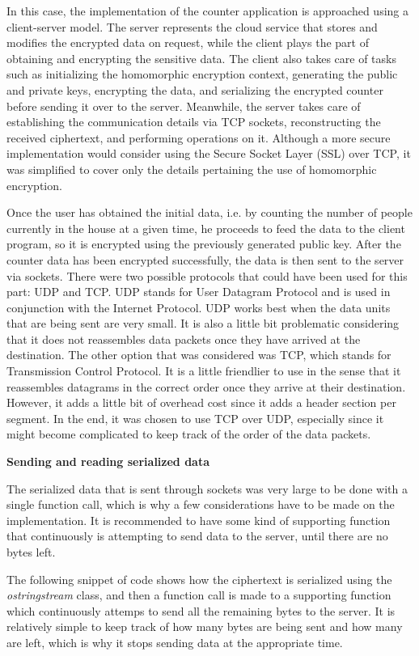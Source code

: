 In this case, the implementation of the counter application is approached using a client-server model. The server represents the cloud service that stores and modifies the encrypted data on request, while the client plays the part of obtaining and encrypting the sensitive data. The client also takes care of tasks such as initializing the homomorphic encryption context, generating the public and private keys, encrypting the data, and serializing the encrypted counter before sending it over to the server. Meanwhile, the server takes care of establishing the communication details via TCP sockets, reconstructing the received ciphertext, and performing operations on it. Although a more secure implementation would consider using the Secure Socket Layer (SSL) over TCP, it was simplified to cover only the details pertaining the use of homomorphic encryption.

Once the user has obtained the initial data, i.e. by counting the number of people currently in the house at a given time, he proceeds to feed the data to the client program, so it is encrypted using the previously generated public key. After the counter data has been encrypted successfully, the data is then sent to the server via sockets. There were two possible protocols that could have been used for this part: UDP and TCP. UDP stands for User Datagram Protocol and is used in conjunction with the Internet Protocol. UDP works best when the data units that are being sent are very small. It is also a little bit problematic considering that it does not reassembles data packets once they have arrived at the destination. The other option that was considered was TCP, which stands for Transmission Control Protocol. It is a little friendlier to use in the sense that it reassembles datagrams in the correct order once they arrive at their destination. However, it adds a little bit of overhead cost since it adds a header section per segment. In the end, it was chosen to use TCP over UDP, especially since it might become complicated to keep track of the order of the data packets.

\textbf{Sending and reading serialized data}

The serialized data that is sent through sockets was very large to be done with a single function call, which is why a few considerations have to be made on the implementation. It is recommended to have some kind of supporting function that continuously is attempting to send data to the server, until there are no bytes left.

The following snippet of code shows how the ciphertext is serialized using the \textit{ostringstream} class, and then a function call is made to a supporting function which continuously attemps to send all the remaining bytes to the server. It is relatively simple to keep track of how many bytes are being sent and how many are left, which is why it stops sending data at the appropriate time.

